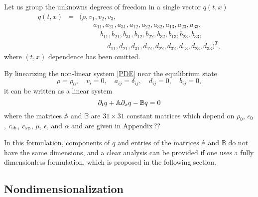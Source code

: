 \documentclass[
10pt, %
a4paper, %
oneside, %
headinclude,footinclude, %
table
]{scrartcl}
\begin{document}
Let us group the unknowns degrees of freedom in a single vector $q(t,x)$
\begin{equation}
\begin{array}{rcl}    
q(t,x)&=&\Big(\rho,v_{1},v_{2},v_{3}, \\
&&	\quad\quad	a_{11}, a_{21}, a_{31},
a_{12}, a_{22}, a_{32},
a_{13}, a_{23}, a_{33},\\
&& 	\quad\quad\quad 	b_{11}, b_{21}, b_{31},
b_{12}, b_{22}, b_{32},
b_{13}, b_{23}, b_{33},\\
&&  	\quad\quad\quad\quad d_{11}, d_{21}, d_{31},
d_{12}, d_{22}, d_{32},
d_{13}, d_{23}, d_{33}\Big)^T,
\end{array}
\end{equation}
where $(t,x)$ dependence has been omitted. 

By linearizing the non-linear system \eqref{PDE} near the equilibrium state
\begin{equation}\label{equilibrium.state}
\rho = \rho_0, \quad v_i = 0, \quad a_{ij} = \delta_{ij}, \quad d_{ij } = 0, \quad b_{ij} = 0,
\end{equation}
it can be written as a linear system
\begin{equation}\label{LinSyst}
\partial_{t}q+\mathbb{A}\partial_{x}q-\mathbb{B}q = 0
\end{equation}
where the matrices $\mathbb{A}$ and $\mathbb{B}$ are $31\times 31$ constant matrices which depend on
$\rho_{0}$, $c_{0}$, $c_\text{sh}$, $c_\text{sp}$, $\mu$, $\epsilon$, and $\alpha$ and are given in Appendix\,??

In this formulation, components of $q$ and entries of the matrices $\mathbb{A}$ and $\mathbb{B}$ 
do not have the same 
dimensions, and a clear analysis can be provided if one uses a fully dimensionless formulation, 
which is proposed in the following section.


\subsection{Nondimensionalization}
\end{document}
